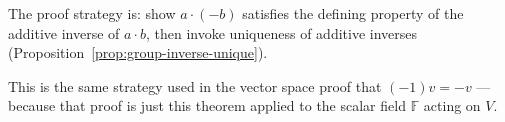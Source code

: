 \begin{remark*}[Flash]
\end{remark*}


\begin{remark}
The proof strategy is: show $a \cdot (-b)$ satisfies the defining
property of the additive inverse of $a \cdot b$, then invoke
uniqueness of additive inverses
(Proposition~\ref{prop:group-inverse-unique}).

This is the same strategy used in the vector space proof that
$(-1)v = -v$ --- because that proof is just this theorem applied
to the scalar field $\mathbb{F}$ acting on $V$.
\end{remark}
